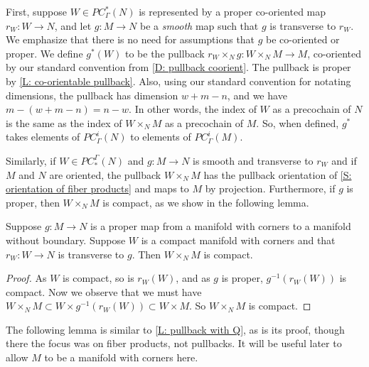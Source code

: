 First, suppose $W \in PC^*_\Gamma(N)$ is represented by a proper co-oriented map $r_W \colon W \to N$, and let $g \colon M \to N$ be a \textit{smooth} map such that $g$ is transverse to $r_W$.
We emphasize that there is no need for assumptions that $g$ be co-oriented or proper.
We define $g^*(W)$ to be the pullback $r_W \times_N g \colon W \times_N M \to M$, co-oriented by our standard convention from \cref{D: pullback coorient}.
The pullback is proper by \cref{L: co-orientable pullback}.
Also, using our standard convention for notating dimensions, the pullback has dimension $w+m-n$, and we have $m - (w+m-n) = n - w$. In other words, the index of $W$ as a precochain of $N$ is the same as the index of $W \times_N M$ as a precochain of $M$.
So, when defined, $g^*$ takes elements of $PC_\Gamma^i(N)$ to elements of $PC_\Gamma^i(M)$.

Similarly, if $W \in PC_*^\Gamma(N)$ and $g \colon M \to N$ is smooth and transverse to $r_W$ and if $M$ and $N$ are oriented, the pullback $W \times_N M$ has the pullback orientation of \cref{S: orientation of fiber products} and maps to $M$ by projection.
Furthermore, if $g$ is proper, then $W \times_N M$ is compact, as we show in the following lemma.

\begin{lemma}\label{L: compact pullback}
	Suppose $g \colon M \to N$ is a proper map from a manifold with corners to a manifold without boundary.
	Suppose $W$ is a compact manifold with corners and that $r_W \colon W \to N$ is transverse to $g$.
	Then $W \times_N M$ is compact.
\end{lemma}

\begin{proof}
	As $W$ is compact, so is $r_W(W)$, and as $g$ is proper, $g^{-1}(r_W(W))$ is compact.
	Now we observe that we must have $W \times_N M \subset W \times g^{-1}(r_W(W)) \subset W \times M$.
	So $W \times_N M$ is compact.
\end{proof}

The following lemma is similar to \cref{L: pullback with Q}, as is its proof, though there the focus was on fiber products, not pullbacks.
It will be useful later to allow $M$ to be a manifold with corners here.

\begin{comment}
	\red{GBF: Might want to try to combine those into a single lemma somewhere at some point, but it looks like it might be less messy, if a bit redundant, not to.}
\end{comment}

